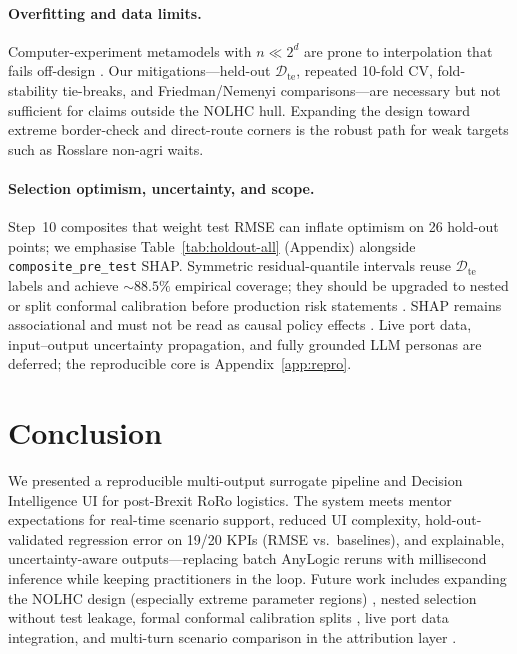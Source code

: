 \documentclass[12pt,twocolumn,a4paper]{article}
\theoremstyle{plain}
\theoremstyle{definition}
\theoremstyle{remark}
\newcommand{\test}{\mathcal{D}_{\mathrm{te}}}
\begin{document}
\paragraph{Overfitting and data limits.}
Computer-experiment metamodels with $n{\ll}2^d$ are prone to interpolation that fails off-design \citep{vabalas2019,razavi2012,simpson2001}.
Our mitigations---held-out $\test$, repeated 10-fold CV, fold-stability tie-breaks, and Friedman/Nemenyi comparisons---are necessary but not sufficient for claims outside the NOLHC hull.
Expanding the design toward extreme border-check and direct-route corners \citep{viana2016} is the robust path for weak targets such as Rosslare non-agri waits.

\paragraph{Selection optimism, uncertainty, and scope.}
Step~10 composites that weight test RMSE can inflate optimism on 26 hold-out points; we emphasise Table~\ref{tab:holdout-all} (Appendix) alongside \texttt{composite\_pre\_test} SHAP.
Symmetric residual-quantile intervals reuse $\test$ labels and achieve ${\sim}88.5\%$ empirical coverage; they should be upgraded to nested or split conformal calibration before production risk statements \citep{angelopoulos2023conformal,romano2019cqr}.
SHAP remains associational and must not be read as causal policy effects \citep{lundberg2017shap,salih2023shap}.
Live port data, input--output uncertainty propagation, and fully grounded LLM personas are deferred; the reproducible core is Appendix~\ref{app:repro}.

\section{Conclusion}
\label{sec:conclusion}

We presented a reproducible multi-output surrogate pipeline and Decision Intelligence UI for post-Brexit RoRo logistics.
The system meets mentor expectations for real-time scenario support, reduced UI complexity, hold-out-validated regression error on 19/20 KPIs (RMSE vs.\ baselines), and explainable, uncertainty-aware outputs---replacing batch AnyLogic reruns with millisecond inference while keeping practitioners in the loop.
Future work includes expanding the NOLHC design (especially extreme parameter regions) \citep{viana2016}, nested selection without test leakage, formal conformal calibration splits \citep{angelopoulos2023conformal}, live port data integration, and multi-turn scenario comparison in the attribution layer \citep{monarch2021,laato2022}.
\end{document}

